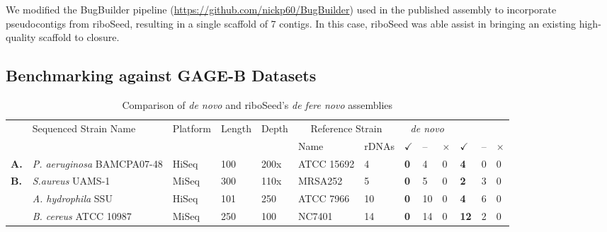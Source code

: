 \documentclass[a4,center,fleqn]{NAR}
\begin{document}
We modified the BugBuilder pipeline (\url{https://github.com/nickp60/BugBuilder}) used in the published assembly to incorporate pseudocontigs from riboSeed, resulting in a single scaffold of 7 contigs. In this case, riboSeed was able assist in bringing an existing high-quality scaffold to closure.


\subsection*{Benchmarking against GAGE-B Datasets}
\begin{table*}[!hb]
  \centering
  \caption{Comparison of \textit{de novo} and riboSeed's \textit{de fere novo} assemblies}
  \label{table:assemblyresults}
  \begin{tabular}{p{.3cm}p{5.2cm}p{.95cm}p{.75cm}p{.75cm}p{2.63cm}p{.6cm}>{\hfill}p{.4cm}p{.2cm}p{.1cm}>{\hfill}p{.4cm}p{.2cm}p{.1cm}}
    \toprule
    & \multirow{2}{*}{Sequenced Strain Name} & \multirow{2}{*}{Platform}  & \multirow{2}{*}{Length} & \multirow{2}{*}{Depth}  &  \multicolumn{2}{c}{Reference Strain} &  \multicolumn{3}{c}{\textit{de novo}} & \multicolumn{3}{c}{\textit{de fere novo}} \\
   & & & & & Name & rDNAs & \textbf{$\checkmark$} & -- & $\times$ & \textbf{$\checkmark$} & -- & $\times$  \\
    \toprule
   \textbf{A.}  & \textit{P. aeruginosa} BAMCPA07-48 & HiSeq & 100 & 200x & ATCC 15692  & 4 & \textbf{0} & 4 & 0 & \textbf{4} & 0 & 0 \\
    \botrule
   \textbf{B.} & \textit{S.aureus} UAMS-1 & MiSeq & 300 & 110x & MRSA252  & 5 &  \textbf{0} & 5 & 0   & \textbf{2} & 3 & 0 \\
    \toprule
    & \textit{A. hydrophila} SSU   & HiSeq   & 101   & 250   & ATCC 7966 & 10 & \textbf{0} & 10 & 0  & \textbf{4} & 6 & 0  \\


    & \textit{B. cereus} ATCC 10987   & MiSeq   & 250   & 100  & NC7401 & 14 & \textbf{0} & 14 & 0  & \textbf{12} & 2 & 0  \\


\end{tabular}
\end{table*}
\end{document}
